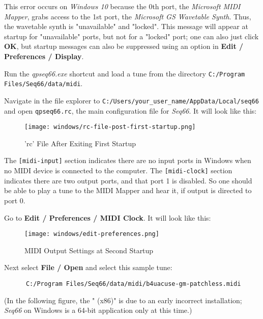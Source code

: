    This error occurs on \textsl{Windows 10} because the 0th port, the
   \textsl{Microsoft MIDI Mapper}, grabs access to the 1st port, the
   \textsl{Microsoft GS Wavetable Synth}.
   Thus, the wavetable synth is "unavailable" and "locked".
   This message will appear at startup for "unavailable" ports,
   but not for a "locked" port; one can also just click
   \textbf{OK}, but startup messages can also be suppressed using an option in
   \textbf{Edit / Preferences / Display}.

   Run the \textsl{qpseq66.exe} shortcut and load a tune from the
   directory \texttt{C:/Program Files/Seq66/data/midi}.

   Navigate in the file explorer to
   \texttt{C:/Users/your\_user\_name/AppData/Local/seq66} and open
   \texttt{qpseq66.rc}, the main configuration file for \textsl{Seq66}.
   It will look like this:

\begin{figure}[H]
   \centering 
   \texttt{[image: windows/rc-file-post-first-startup.png]}
   \caption{'rc' File After Exiting First Startup}
   \label{fig:windows_rc_file_post_first_startup}
\end{figure}

   The \texttt{[midi-input]} section indicates there are no input ports
   in Windows when no MIDI device is connected to the computer.
   The \texttt{[midi-clock]} section indicates there are two output
   ports, and that port 1 is disabled.   So one should be able to
   play a tune to the MIDI Mapper and hear it, if output is directed
   to port 0.

   Go to \textbf{Edit / Preferences / MIDI Clock}.
   It will look like this:

\begin{figure}[H]
   \centering 
   \texttt{[image: windows/edit-preferences.png]}
   \caption{MIDI Output Settings at Second Startup}
   \label{fig:windows_output_settings_second_startup}
\end{figure}

   Next select \textbf{File / Open} and select this sample tune:

   \begin{verbatim}
      C:/Program Files/Seq66/data/midi/b4uacuse-gm-patchless.midi
   \end{verbatim}

   (In the following figure, the " (x86)" is due to an early incorrect
   installation; \textsl{Seq66} on Windows is a 64-bit application only
   at this time.)

